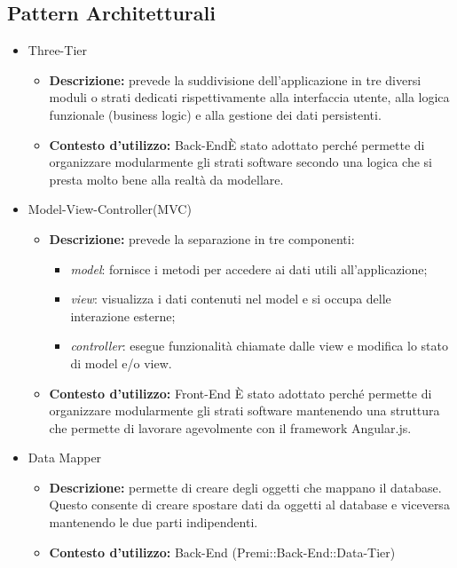 	\subsection{Pattern Architetturali}
		\begin{itemize}
			\item  Three-Tier 
			\begin{itemize}
				\item \textbf{Descrizione:} prevede la suddivisione dell'applicazione in tre diversi moduli o strati dedicati rispettivamente alla interfaccia utente, alla logica funzionale (\gls{business} logic) e alla gestione dei dati persistenti.
				\item \textbf{Contesto d'utilizzo:} \gls{Back-End}\newline È stato adottato perché permette di organizzare modularmente gli strati software secondo una logica che si presta molto bene alla realtà da modellare. 
			\end{itemize}
			\item Model-View-Controller(\gls{MVC})
			\begin{itemize}
				\item \textbf{Descrizione:} prevede la separazione in tre componenti:
    \begin{itemize}
	  \item \textit{model}: fornisce i metodi per accedere ai dati utili all'applicazione;
	  \item \textit{view}:  visualizza i dati contenuti nel model e si occupa delle interazione esterne;
	  \item \textit{controller}: esegue funzionalità chiamate dalle view e modifica lo stato di model e/o view.
    \end{itemize}
				\item \textbf{Contesto d'utilizzo:} \gls{Front-End} \newline È stato adottato perché permette di organizzare modularmente gli strati software mantenendo una struttura che permette di lavorare agevolmente con il \gls{framework} \gls{Angular}.js. 
			\end{itemize}
			\item Data Mapper
			\begin{itemize}
				\item \textbf{Descrizione:} permette di creare degli oggetti che mappano il \gls{database}. Questo consente di creare spostare dati da oggetti al \gls{database} e viceversa mantenendo le due parti indipendenti.
				\item \textbf{Contesto d'utilizzo:} \gls{Back-End} (Premi::\gls{Back-End}::Data-Tier)
			\end{itemize}
		\end{itemize}

